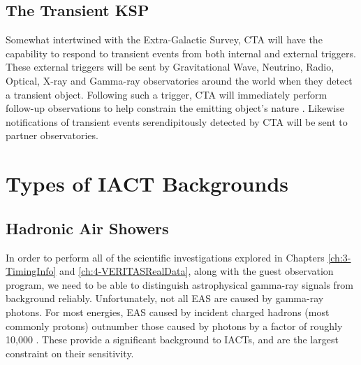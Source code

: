 \subsection{The Transient KSP} Somewhat intertwined with the Extra-Galactic Survey, CTA will have the capability to respond to transient events from both internal and external triggers. These external triggers will be sent by Gravitational Wave, Neutrino, Radio, Optical, X-ray and Gamma-ray observatories around the world when they detect a transient object. Following such a trigger, CTA will immediately perform follow-up observations to help constrain the emitting object's nature \cite{scienceCTA}. Likewise notifications of transient events serendipitously detected by CTA will be sent to partner observatories.

\section{Types of IACT Backgrounds}
\subsection{Hadronic Air Showers}

In order to perform all of the scientific investigations explored in Chapters \ref{ch:3-TimingInfo} and \ref{ch:4-VERITASRealData}, along with the guest observation program, we need to be able to distinguish astrophysical gamma-ray signals from background reliably. Unfortunately, not all EAS are caused by gamma-ray photons. For most energies, EAS caused by incident charged hadrons (most commonly protons) outnumber those caused by photons by a factor of roughly 10,000 \cite{Benbow}. These provide a significant background to IACTs, and are the largest constraint on their sensitivity.

